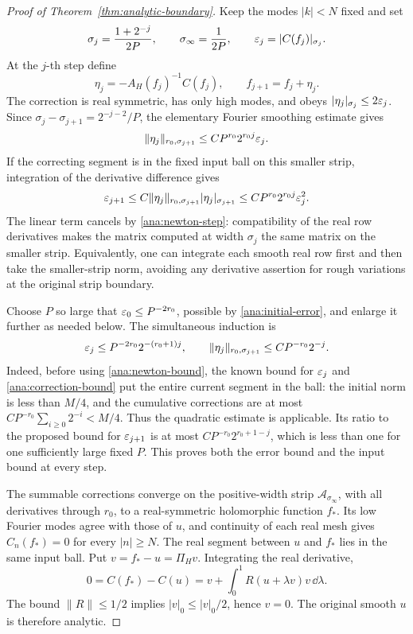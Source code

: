 \begin{proof}[Proof of Theorem~\ref{thm:analytic-boundary}]
Keep the modes \(|k|<N\) fixed and set
\[
 \sigma_j=\frac{1+2^{-j}}{2P},\qquad
 \sigma_\infty=\frac1{2P},\qquad
 \varepsilon_j=|C(f_j)|_{\sigma_j}.
\]
At the \(j\)-th step define
\begin{equation}\label{ana:newton-step}
 \eta_j=-A_H(f_j)^{-1}C(f_j),\qquad f_{j+1}=f_j+\eta_j.
\end{equation}
The correction is real symmetric, has only high modes, and obeys
\(|\eta_j|_{\sigma_j}\le2\varepsilon_j\).  Since
\(\sigma_j-\sigma_{j+1}=2^{-j-2}/P\), the elementary Fourier
smoothing estimate gives
\begin{equation}\label{ana:correction-bound}
 \|\eta_j\|_{r_0,\sigma_{j+1}}
 \le C P^{r_0}2^{r_0j}\varepsilon_j.
\end{equation}
If the correcting segment is in the fixed input ball on this smaller
strip, integration of the derivative difference gives
\begin{equation}\label{ana:newton-bound}
 \varepsilon_{j+1}\le
 C\|\eta_j\|_{r_0,\sigma_{j+1}}|\eta_j|_{\sigma_{j+1}}
 \le C P^{r_0}2^{r_0j}\varepsilon_j^2.
\end{equation}
The linear term cancels by \eqref{ana:newton-step}: compatibility of
the real row derivatives makes the matrix computed at width
\(\sigma_j\) the same matrix on the smaller strip.  Equivalently,
one can integrate each smooth real row first and then take the
smaller-strip norm, avoiding any derivative assertion for rough
variations at the original strip boundary.

Choose \(P\) so large that \(\varepsilon_0\le P^{-2r_0}\), possible by
\eqref{ana:initial-error}, and enlarge it further as needed below.
The simultaneous induction is
\begin{equation}\label{ana:newton-majorant}
 \varepsilon_j\le P^{-2r_0}2^{-(r_0+1)j},
 \qquad
 \|\eta_j\|_{r_0,\sigma_{j+1}}
 \le C P^{-r_0}2^{-j}.
\end{equation}
Indeed, before using \eqref{ana:newton-bound}, the known bound for
\(\varepsilon_j\) and \eqref{ana:correction-bound} put the entire current
segment in the ball: the initial norm is less than \(M/4\), and
the cumulative corrections are at most
\(CP^{-r_0}\sum_{i\ge0}2^{-i}<M/4\).  Thus the quadratic estimate
is applicable.  Its ratio to the proposed bound for \(\varepsilon_{j+1}\)
is at most \(CP^{-r_0}2^{r_0+1-j}\), which is less than one for
one sufficiently large fixed \(P\).  This proves both the error
bound and the input bound at every step.

The summable corrections converge on the positive-width strip
\(\mathcal A_{\sigma_\infty}\), with all derivatives through
\(r_0\), to a real-symmetric holomorphic function \(f_*\).
Its low Fourier modes agree with those of \(u\), and continuity
of each real mesh gives \(C_n(f_*)=0\) for every \(|n|\ge N\).
The real segment between \(u\) and \(f_*\) lies in the same input
ball.  Put \(v=f_*-u=\Pi_Hv\).  Integrating the real derivative,
\[
 0=C(f_*)-C(u)
   =v+\int_0^1R(u+\lambda v)v\,\dd\lambda.
\]
The bound \(\|R\|\le1/2\) implies \(|v|_0\le|v|_0/2\), hence
\(v=0\).  The original smooth \(u\) is therefore analytic.


\end{proof}
